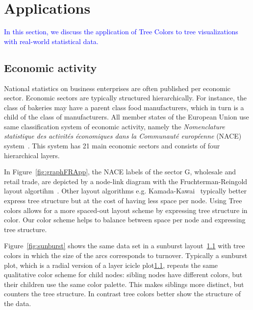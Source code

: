 \documentclass[journal]{vgtc}                %
\newcommand{\changedE}[1]{\textcolor{cornellred}{#1}}
\newcommand{\changedM}[1]{\textcolor{blue}{#1}}
\begin{document}


\section{Applications}\label{secapplication}

\changedM{In this section, we discuss the application of Tree Colors to tree visualizations with real-world statistical data.}

\subsection{Economic activity}

National statistics on business enterprises are often published per economic sector. Economic sectors are typically structured hierarchically. For instance, the class of bakeries may have a parent class food manufacturers, which in turn is a child of the class of manufacturers. All member states of the European Union use same classification system of economic activity, namely the \textit{Nomenclature statistique des activit\'es \'economiques dans la Communaut\'e europ\'eenne} (NACE) system~\cite{nace}. This system has 21 main economic sectors and consists of four hierarchical layers.

In Figure~\ref{fig:graphFRApp}, the NACE labels of the sector G, wholesale and retail trade, are depicted by a node-link diagram with the Fruchterman-Reingold layout algortihm~\cite{Fruchterman91}. \changedE{Other layout algorithms e.g. Kamada-Kawai~\cite{Kamada89} typically better express tree structure but at the cost of having less space per node. Using Tree colors allows for a more spaced-out layout scheme by expressing tree structure in color. Our color scheme helps to balance between space per node and expressing tree structure.
}

\changedE{
Figure~\ref{fig:sunburst} shows the same data set in a sunburst layout~\ref{} with tree colors in which the size of the arcs corresponds to turnover. Typically a sunburst plot, which is a radial version of a layer icicle plot\ref{}, repeats the same qualitative color scheme for child nodes: sibling nodes have different colors, but their children use the same color palette. This makes siblings more distinct, but counters the tree structure. In contrast tree colors better show the structure of the data.
}
\end{document}
